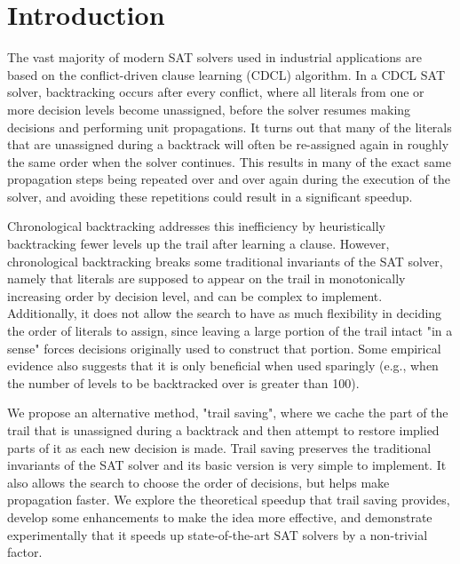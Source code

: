 \documentclass{article}
\begin{document}
\begin{abstract}
\end{abstract}

\section{Introduction}
The vast majority of modern SAT solvers used in industrial applications are based on the conflict-driven clause learning (CDCL) algorithm. In a CDCL SAT solver, backtracking occurs after every conflict, where all literals from one or more decision levels become unassigned, before the solver resumes making decisions and performing unit propagations. It turns out that many of the literals that are unassigned during a backtrack will often be re-assigned again in roughly the same order when the solver continues. This results in many of the exact same propagation steps being repeated over and over again during the execution of the solver, and avoiding these repetitions could result in a significant speedup.

Chronological backtracking \cite{DBLP:conf/lpar/2013, DBLP:conf/sat/MohleB19, DBLP:conf/sat/NadelR18} addresses this inefficiency by heuristically backtracking fewer levels up the trail after learning a clause. However, chronological backtracking breaks some traditional invariants of the SAT solver, namely that literals are supposed to appear on the trail in monotonically increasing order by decision level, and can be complex to implement. Additionally, it does not allow the search to have as much flexibility in deciding the order of literals to assign, since leaving a large portion of the trail intact "in a sense" forces decisions originally used to construct that portion. Some empirical evidence also suggests that it is only beneficial when used sparingly (e.g., when the number of levels to be backtracked over is greater than 100).

We propose an alternative method, "trail saving", where we cache the part of the trail that is unassigned during a backtrack and then attempt to restore implied parts of it as each new decision is made. Trail saving preserves the traditional invariants of the SAT solver and its basic version is very simple to implement. It also allows the search to choose the order of decisions, but helps make propagation faster. We explore the theoretical speedup that trail saving provides, develop some enhancements to make the idea more effective, and demonstrate experimentally that it speeds up state-of-the-art SAT solvers by a non-trivial factor.
\end{document}
